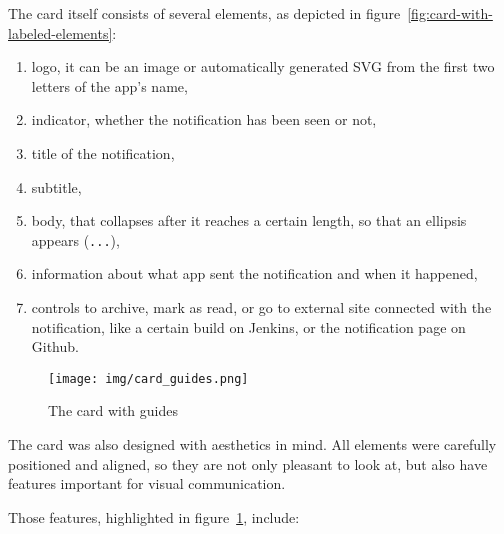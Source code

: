 The card itself consists of several elements,
as depicted in figure~\ref{fig:card-with-labeled-elements}:

\begin{enumerate}
      \item
            logo,
            it can be an image
            or automatically generated SVG
            from the first two letters of the app's name,
      \item
            indicator,
            whether the notification has been seen or not,
      \item
            title of the notification,
      \item
            subtitle,
      \item
            body,
            that collapses after it reaches a certain length,
            so that an ellipsis appears (\texttt{...}),
      \item
            information about what app sent the notification and when it happened,
      \item
            controls to archive,
            mark as read,
            or go to external site connected with the notification,
            like a certain build on Jenkins,
            or the notification page on Github.
\end{enumerate}

\begin{figure}[h]
      \centering
      \texttt{[image: img/card\_guides.png]}
      \caption{The card with guides}
      \label{fig:card-with-guides}
\end{figure}

The card was also designed with aesthetics in mind.
All elements were carefully positioned and aligned,
so they are not only pleasant to look at,
but also have features important for visual communication.

Those features, highlighted in figure~\ref{fig:card-with-guides}, include:

